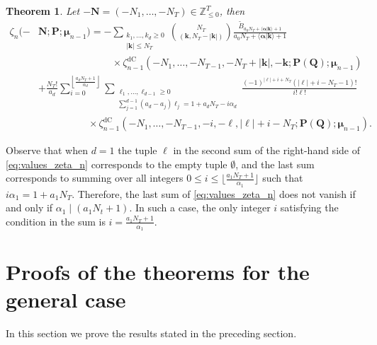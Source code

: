 \documentclass[a4paper,12pt]{article}
\newtheorem{thm}{Theorem}
\theoremstyle{definition}
\numberwithin{equation}{section}
\newcommand{\dc}{\mathrm{dC}}
\begin{document}
\begin{thm}
\label{th:value_zeta_n}
Let $-\mathbf{N}=(-N_1,\ldots,-N_T) \in \mathbb{Z}_{\leq 0}^T$, then
\begin{align}
    \zeta_{n}(-&\mathbf{N};\mathbf{P};\boldsymbol{\mu}_{n-1})=-\sum_{\substack{k_1,\ldots,k_d \geq 0 \\ |\mathbf{k}| \leq N_T}} \binom{N_T}{(\mathbf{k},N_T-|\mathbf{k}|)} \frac{\widetilde{B}_{a_0N_T+\langle \boldsymbol{\alpha}|\mathbf{k}\rangle+1}}{a_0N_T+\langle \boldsymbol{\alpha}|\mathbf{k} \rangle+1} \label{eq:values_zeta_n} \\
    & \hspace{89pt} \times \zeta_{n-1}^{\dc}(-N_1,\ldots,-N_{T-1},-N_T+|\mathbf{k}|,-\mathbf{k};\mathbf{P(Q)};\boldsymbol{\mu}_{n-1}) \nonumber \\
    &+ \frac{N_T!}{a_d}\sum_{i=0}^{\left\lfloor \frac{a_dN_T+1}{\alpha_d}\right\rfloor} \sum_{\substack{\ell_1,\ldots,\ell_{d-1} \geq 0 \\ \sum_{j=1}^{d-1} (a_d-a_j) \ell_j=1+a_dN_T-i\alpha_d}} \frac{(-1)^{|\boldsymbol{\ell}|+i+N_T}(|\boldsymbol{\ell}|+i-N_T-1)!}{i!\boldsymbol{\ell}!} \nonumber \\
    & \hspace{60pt} \times \zeta_{n-1}^{\dc}(-N_1,\ldots,-N_{T-1},-i,-\boldsymbol{\ell},|\boldsymbol{\ell}|+i-N_T;\mathbf{P(Q)};\boldsymbol{\mu}_{n-1}). \nonumber
\end{align}
\end{thm}

Observe that when $d=1$ the tuple $\boldsymbol{\ell}$ in the second sum of the right-hand side of \eqref{eq:values_zeta_n} corresponds to the empty tuple $\emptyset$, and the last sum corresponds to summing over all integers $0 \leq i \leq \lfloor \frac{a_1N_T+1}{\alpha_1}\rfloor$ such that $i\alpha_1=1+a_1 N_T$. Therefore, the last sum of \eqref{eq:values_zeta_n} does not vanish if and only if $\alpha_1\mid (a_1 N_t +1)$. In such a case, the only integer $i$ satisfying the condition in the sum is $i=\frac{a_1N_T+1}{\alpha_1}$.

\section{Proofs of the theorems for the general case}\label{section:proofs}


In this section we prove the results stated in the preceding section.
\end{document}
